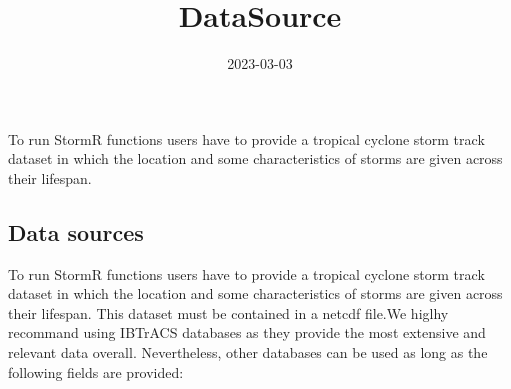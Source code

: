 \documentclass[
]{article}
\title{DataSource}
\author{}
\date{\vspace{-2.5em}2023-03-03}
\begin{document}
\maketitle

To run StormR functions users have to provide a tropical cyclone storm
track dataset in which the location and some characteristics of storms
are given across their lifespan.

\hypertarget{data-sources}{%
\subsection{Data sources}\label{data-sources}}

To run StormR functions users have to provide a tropical cyclone storm
track dataset in which the location and some characteristics of storms
are given across their lifespan. This dataset must be contained in a
netcdf file.We higlhy recommand using IBTrACS databases as they provide
the most extensive and relevant data overall. Nevertheless, other
databases can be used as long as the following fields are provided:
\end{document}
